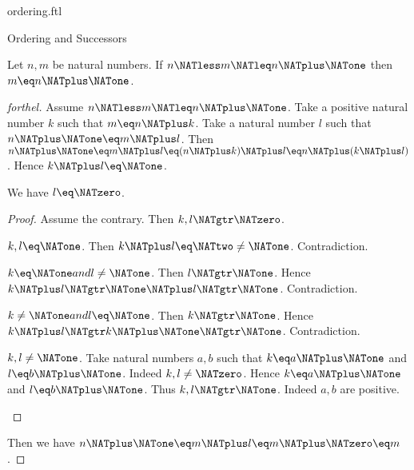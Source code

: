 \documentclass{naproche-library}
\begin{document}
\begin{smodule}[title=The Standard Ordering of the Natural Numbers]{ordering.ftl}
\begin{sfragment}{Ordering and Successors}
  \begin{proposition}[forthel,id=ARITHMETIC_04_7006203091615744]
    Let $n, m$ be natural numbers.
    If $n \NATless m \NATleq n \NATplus \NATone$ then $m \eq n \NATplus \NATone$.
  \end{proposition}
  \begin{proof}[forthel]
    Assume $n \NATless m \NATleq n \NATplus \NATone$.
    Take a positive natural number $k$ such that $m \eq n \NATplus k$.
    Take a natural number $l$ such that $n \NATplus \NATone \eq m \NATplus l$.
    Then $n \NATplus \NATone
      \eq m \NATplus l
      \eq (n \NATplus k) \NATplus l
      \eq n \NATplus (k \NATplus l)$.
    Hence $k \NATplus l \eq \NATone$.

    We have $l \eq \NATzero$.
    \begin{proof}
      Assume the contrary.
      Then $k,l \NATgtr \NATzero$.

      \begin{case}{$k,l \eq \NATone$.}
        Then $k \NATplus l
          \eq \NATtwo
          \neq \NATone$.
        Contradiction.
      \end{case}

      \begin{case}{$k \eq \NATone and l \neq \NATone$.}
        Then $l \NATgtr \NATone$.
        Hence $k \NATplus l
          \NATgtr \NATone \NATplus l
          \NATgtr \NATone$.
        Contradiction.
      \end{case}

      \begin{case}{$k \neq \NATone and l \eq \NATone$.}
        Then $k \NATgtr \NATone$.
        Hence $k \NATplus l
          \NATgtr k \NATplus \NATone
          \NATgtr \NATone$.
        Contradiction.
      \end{case}

      \begin{case}{$k, l \neq \NATone$.}
        Take natural numbers $a, b$ such that $k \eq a \NATplus \NATone$ and $l \eq b \NATplus \NATone$.
        Indeed $k, l \neq \NATzero$.
        Hence $k \eq a \NATplus \NATone$ and $l \eq b \NATplus \NATone$.
        Thus $k, l \NATgtr \NATone$. Indeed $a, b$ are positive.
      \end{case}
    \end{proof}

    Then we have $n \NATplus \NATone
      \eq m \NATplus l
      \eq m \NATplus \NATzero
      \eq m$.
  \end{proof}


\end{sfragment}
\end{smodule}
\end{document}
